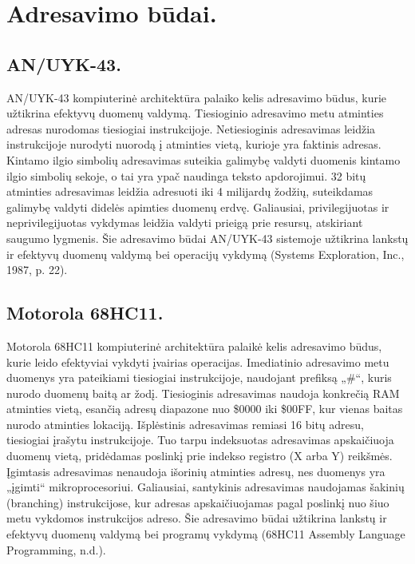 \documentclass[a4paper,12pt]{article}
\begin{document}
\section{Adresavimo būdai.}
\subsection{AN/UYK-43.}
AN/UYK-43 kompiuterinė architektūra palaiko kelis adresavimo būdus, kurie užtikrina efektyvų duomenų valdymą. Tiesioginio adresavimo metu atminties adresas nurodomas tiesiogiai instrukcijoje. Netiesioginis adresavimas leidžia instrukcijoje nurodyti nuorodą į atminties vietą, kurioje yra faktinis adresas. Kintamo ilgio simbolių adresavimas suteikia galimybę valdyti duomenis kintamo ilgio simbolių sekoje, o tai yra ypač naudinga teksto apdorojimui. 32 bitų atminties adresavimas leidžia adresuoti iki 4 milijardų žodžių, suteikdamas galimybę valdyti didelės apimties duomenų erdvę. Galiausiai, privilegijuotas ir neprivilegijuotas vykdymas leidžia valdyti prieigą prie resursų, atskiriant saugumo lygmenis. Šie adresavimo būdai AN/UYK-43 sistemoje užtikrina lankstų ir efektyvų duomenų valdymą bei operacijų vykdymą (Systems Exploration, Inc., 1987, p. 22).
\subsection{Motorola 68HC11.}
Motorola 68HC11 kompiuterinė architektūra palaikė kelis adresavimo būdus, kurie leido efektyviai vykdyti įvairias operacijas. Imediatinio adresavimo metu duomenys yra pateikiami tiesiogiai instrukcijoje, naudojant prefiksą „\#“, kuris nurodo duomenų baitą ar žodį. Tiesioginis adresavimas naudoja konkrečią RAM atminties vietą, esančią adresų diapazone nuo \$0000 iki \$00FF, kur vienas baitas nurodo atminties lokaciją. Išplėstinis adresavimas remiasi 16 bitų adresu, tiesiogiai įrašytu instrukcijoje. Tuo tarpu indeksuotas adresavimas apskaičiuoja duomenų vietą, pridėdamas poslinkį prie indekso registro (X arba Y) reikšmės. Įgimtasis adresavimas nenaudoja išorinių atminties adresų, nes duomenys yra „įgimti“ mikroprocesoriui. Galiausiai, santykinis adresavimas naudojamas šakinių (branching) instrukcijose, kur adresas apskaičiuojamas pagal poslinkį nuo šiuo metu vykdomos instrukcijos adreso. Šie adresavimo būdai užtikrina lankstų ir efektyvų duomenų valdymą bei programų vykdymą (68HC11 Assembly Language Programming, n.d.).
\end{document}
